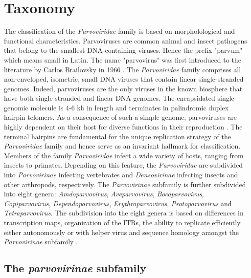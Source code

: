 \section{Taxonomy}
The classification of the \textit{Parvoviridae} family is based on morpholological and functional characteristics. Parvoviruses are common animal and insect pathogens that belong to the smallest DNA-containing viruses. Hence the prefix "parvum" which means small in Latin. The name "parvovirus" was first introduced to the literature by Carlos Brailovsky in 1966 \cite{pmid5902774}.   
The \textit{Parvoviridae} family comprises all non-enveloped, isometric, small DNA viruses that contain linear single-stranded genomes. Indeed, parvoviruses are the only viruses in the known biosphere that have both single-stranded and linear DNA genomes. The encapsidated single genomic molecule is 4-6 kb in length and terminates in palindromic duplex hairpin telomers. As a consequence of such a simple genome, parvoviruses are highly dependent on their host for diverse functions in their reproduction \cite{pmid10497831, parvoviruses}. The terminal hairpins are fundamental for the unique replication strategy of the \textit{Parvoviridae} family and hence serve as an invariant hallmark for classification.
Members of the family \textit{Parvoviridae} infect a wide variety of hosts, ranging from insects to primates.
Depending on this feature, the \textit{Parvoviridae} are subdivided into \textit{Parvovirinae} infecting vertebrates and \textit{Densovirinae} infecting insects and other arthropods, respectively. The \textit{Parvovirinae} subfamily is further subdivided into eight genera: \textit{Amdoparvovirus}, \textit{Aveparvovirus}, \textit{Bocaparvovirus}, \textit{Copiparvovirus}, \textit{Dependoparvovirus}, \textit{Erythroparvovirus}, \textit{Protoparvovirus} and \textit{Tetraparvovirus}. The subdivision into the eight genera is based on differences in transcription maps, organization of the ITRs, the ability to replicate efficiently either autonomously or with helper virus and sequence homology amongst the \textit{Parvovirinae} subfamily \cite{pmid11222696, icvt}.

\subsection{The \textit{parvovirinae} subfamily}
   


